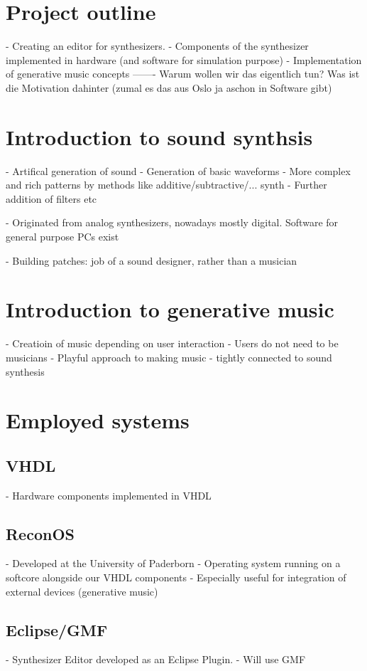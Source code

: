 	\section{Project outline}
	  - Creating an editor for synthesizers. 
	  - Components of the synthesizer implemented in hardware (and software for simulation purpose)
	  - Implementation of generative music concepts
	  ------- Warum wollen wir das eigentlich tun? Was ist die Motivation dahinter (zumal es das aus Oslo ja aschon in Software gibt)
	
	\section{Introduction to sound synthsis}
	  - Artifical generation of sound
	  - Generation of basic waveforms
	    - More complex and rich patterns by methods like additive/subtractive/... synth 
	  - Further addition of filters etc
	  
	  - Originated from analog synthesizers, nowadays mostly digital. Software for general purpose PCs exist
	  
	  - Building patches: job of a sound designer, rather than a musician
	  
	\section{Introduction to generative music}
	  - Creatioin of music depending on user interaction
	  - Users do not need to be musicians
	  - Playful approach to making music
	  - tightly connected to sound synthesis
	  
	\section{Employed systems}
	  \subsection{VHDL}
	    - Hardware components implemented in VHDL
	  \subsection{ReconOS}
	    - Developed at the University of Paderborn
	    - Operating system running on a softcore alongside our VHDL components
	    - Especially useful for integration of external devices (generative music)
	  \subsection{Eclipse/GMF}
	    - Synthesizer Editor developed as an Eclipse Plugin.
	    - Will use GMF

	  
      